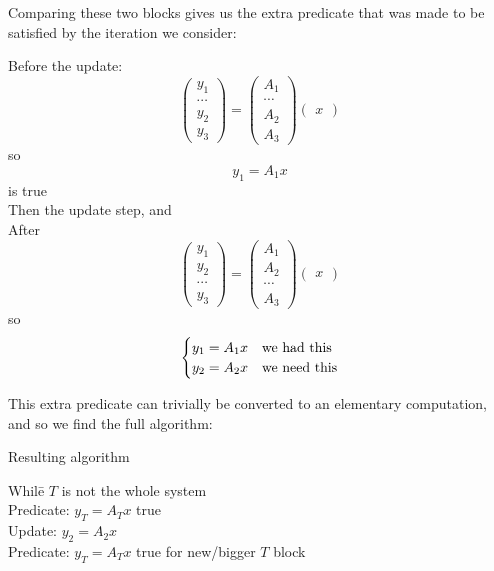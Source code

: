 Comparing these two blocks gives us
the extra predicate that was made to be satisfied
by the iteration we consider:

\begin{block}{}
  Before the update:
  \[
  \begin{pmatrix}
    y_1\\ \cdots \\ y_2 \\ y_3
  \end{pmatrix}
  =
  \begin{pmatrix}
    A_1\\ \cdots \\ A_2 \\ A_3
  \end{pmatrix}
  \begin{pmatrix}
    x 
  \end{pmatrix}
  \]
  so \[ y_1 = A_1 x \] is true\\
  Then the update step, and \\ After
  \[
  \begin{pmatrix}
    y_1\\  y_2 \\ \cdots \\ y_3
  \end{pmatrix}
  =
  \begin{pmatrix}
    A_1 \\ A_2 \\ \cdots \\ A_3
  \end{pmatrix}
  \begin{pmatrix}
    x 
  \end{pmatrix}
  \]
  so \[
  \begin{cases}
    y_1 = A_1x & \hbox{we had this}\\
    y_2 = A_2x & \hbox{we need this}
  \end{cases}
  \]
\end{block}

This extra predicate can trivially be converted
to an elementary computation,
and so we find the full algorithm:

\begin{block}{Resulting algorithm}
  \begin{tabbing}
    Whil\=e $T$ is not the whole system\\
    \> Predicate: $y_T = A_T x$ true\\
    \> Update: $y_2=A_2x$ \\
    \> Predicate: $y_T = A_T x$ true for new/bigger $T$ block\\
  \end{tabbing}
\end{block}

